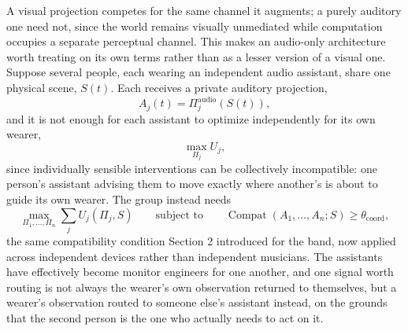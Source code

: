 \documentclass[12pt]{article}
\begin{document}
A visual projection competes for the same channel it augments; a purely auditory one need not, since the world remains visually unmediated while computation occupies a separate perceptual channel. This makes an audio-only architecture worth treating on its own terms rather than as a lesser version of a visual one. Suppose several people, each wearing an independent audio assistant, share one physical scene, $S(t)$. Each receives a private auditory projection,
\[
A_j(t) = \Pi_j^{\mathrm{audio}}(S(t)),
\]
and it is not enough for each assistant to optimize independently for its own wearer,
\[
\max_{\Pi_j} U_j,
\]
since individually sensible interventions can be collectively incompatible: one person's assistant advising them to move exactly where another's is about to guide its own wearer. The group instead needs
\[
\max_{\Pi_1, \ldots, \Pi_n} \sum_j U_j(\Pi_j, S) \qquad \text{subject to} \qquad \operatorname{Compat}(A_1, \ldots, A_n; S) \geq \theta_{\mathrm{coord}},
\]
the same compatibility condition Section 2 introduced for the band, now applied across independent devices rather than independent musicians. The assistants have effectively become monitor engineers for one another, and one signal worth routing is not always the wearer's own observation returned to themselves, but a wearer's observation routed to someone else's assistant instead, on the grounds that the second person is the one who actually needs to act on it.
\end{document}

